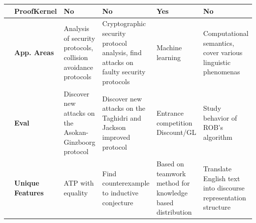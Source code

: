\begin{table}[ht]
{\begin{tabular}{|p{}|p{}|p{4.2cm}|p{4.2cm}|p{4.2cm}|p{4.2cm}|}
 & \textbf{ProofKernel} & No & No & Yes & No\\ \hline
\parbox[t]{2mm}{} & \textbf{App. Areas} & Analysis of security protocols, collision avoidance protocols & Cryptographic security protocol analysis, find attacks on faulty security protocols  & Machine learning & Computational semantics, cover various linguistic phenomenas\\
 & \textbf{Eval} & Discover new attacks on the Asokan-Ginzboorg protocol & Discover new attacks on the Taghidri and Jackson improved protocol & Entrance competition Discount/GL & Study behavior of ROB's algorithm
   \\
& \textbf{Unique Features} & ATP with equality & Find counterexample to inductive conjecture & Based on teamwork method for knowledge based distribution & Translate English text into discourse representation structure
 \\
\hline
\end{tabular}
}
\label{SPASS and Coral}
\end{table}
